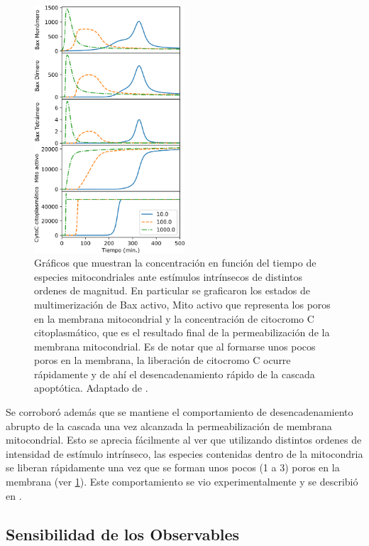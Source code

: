\begin{figure}[t!]
    \centering
    \includegraphics[width=0.5\textwidth]{img/cap_4/sweep_int_stim.png}
    \caption{\footnotesize{Gráficos que muestran la concentración en función del tiempo de especies mitocondriales ante estímulos intrínsecos de distintos ordenes de magnitud. En particular se graficaron los estados de multimerización de Bax activo, Mito activo que representa los poros en la membrana mitocondrial y la concentración de citocromo C citoplasmático, que es el resultado final de la permeabilización de la membrana mitocondrial. Es de notar que al formarse unos pocos poros en la membrana, la liberación de citocromo C ocurre rápidamente y de ahí el desencadenamiento rápido de la cascada apoptótica. Adaptado de \cite{Corbat2021}.}}
    \label{fig:desencadenamiento_rapido}
\end{figure}

Se corroboró además que se mantiene el comportamiento de desencadenamiento abrupto de la cascada una vez alcanzada la permeabilización de membrana mitocondrial. Esto se aprecia fácilmente al ver que utilizando distintos ordenes de intensidad de estímulo intrínseco, las especies contenidas dentro de la mitocondria se liberan rápidamente una vez que se forman unos pocos (1 a 3) poros en la membrana (ver \cref{fig:desencadenamiento_rapido}). Este comportamiento se vio experimentalmente y se describió en \cite{Albeck2008}.


\subsection{Sensibilidad de los Observables}


